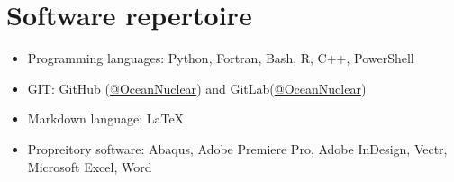 \documentclass[a4paper, 12pt]{article}
\newcommand{\expentry}[3]{\emph{#1}\hfill{#2}---{#3}}
\begin{document}
\section{Software repertoire} %
    \begin{itemize}
    \item Programming languages: Python, Fortran, Bash, R, C++, PowerShell
    \item GIT: GitHub (\href{https://github.com/OceanNuclear}{@OceanNuclear}) and GitLab(\href{https://gitlab.com/OceanNuclear}{@OceanNuclear})
    \item Markdown language: LaTeX
    \item Propreitory software: Abaqus, Adobe Premiere Pro, Adobe InDesign, Vectr, Microsoft Excel, Word
    \end{itemize}
\end{document}
